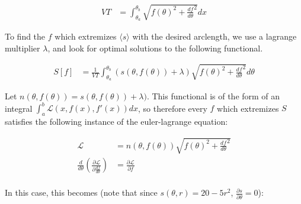 \documentclass{article}
\begin{document}
\begin{align}
V T & = \int_{\theta_a}^{\theta_b} \sqrt{f(\theta)^2 + \frac{df}{d\theta}^2} dx 
	\label{eq:constraint-on-lambda-polar}
\end{align}

To find the $f$ which extremizes $\langle s \rangle$ with the desired arclength,
	we use a lagrange multiplier $\lambda$, and look for optimal solutions
	to the following functional.

\begin{align}
S[f] & = \frac{1}{VT} \int_{\theta_a}^{\theta_b} \left( s(\theta, f(\theta)) + \lambda \right)
	\sqrt{f(\theta)^2 + \frac{df}{d\theta}^2} d\theta \label{eq:action-polar}
\end{align}

Let $n(\theta, f(\theta)) = s(\theta, f(\theta)) + \lambda)$.
This functional is of the form of an integral $\int_a^b \mathcal{L}(x,f(x),f'(x)) dx$,
	so therefore every $f$ which extremizes $S$ satisfies the following
	instance of the euler-lagrange equation:

\begin{align}
\mathcal{L} & = n(\theta, f(\theta)) \sqrt{f(\theta)^2 + \frac{df}{d\theta}^2} \\
\frac{d}{d\theta} \left( \frac{\partial \mathcal{L}}
		{\partial \frac{df}{d\theta}} \right)
	& = \frac{\partial \mathcal{L}}{\partial f} \nonumber \\
\end{align}

In this case, this becomes (note that since $s(\theta, r) = 20 - 5 r^2$, 
	$\frac{\partial s}{\partial \theta} = 0$):
\end{document}
